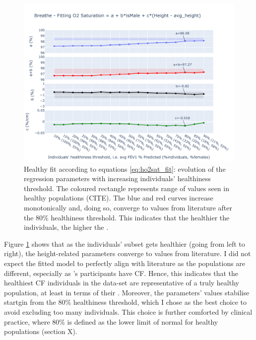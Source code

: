 \begin{figure}[!h]
    \centering
    \includegraphics[width=140mm]{Chapter1/Figs/ho2sat_fit.pdf}
    \caption{Healthy \OXSat fit according to equations \ref{eq:ho2sat_fit}: evolution of the regression parameters with increasing individuals' healthiness threshold. The coloured rectangle represents range of values seen in healthy populations (CITE). The blue and red curves increase monotonically and, doing so, converge to values from literature after the 80\% healthiness threshold. This indicates that the healthier the individuals, the higher the \OXSat.}
    \label{fig:ho2sat_fit}
\end{figure}


Figure \ref{fig:ho2sat_fit} shows that as the individuals' subset gets healthier (going from left to right), the height-related parameters converge to values from literature. I did not expect the fitted model to perfectly align with literature as the populations are different, especially as \BR's participants have CF. Hence, this indicates that the healthiest CF individuals in the data-set are representative of a truly healthy population, at least in terms of their \OXSat. Moreover, the parameters' values stabilise startgin from the 80\% healthiness threshold, which I chose as the best choice to avoid excluding too many individuals. This choice is further comforted by clinical practice, where 80\% \FPrct is defined as the lower limit of normal for healthy populations (section X).

